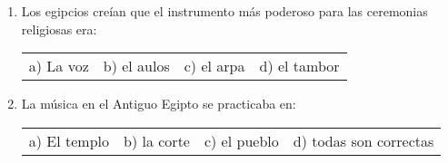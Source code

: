 \documentclass[letterpaper,12pt,notitlepage,spanish]{article}
\begin{document}
%
%
%
\begin{ejercicio}
	\begin{enumerate}
%
%
		\item Los egipcios creían que el instrumento más poderoso para las ceremonias religiosas era: \par
%		
	\begin{tabular}{llll}
		a) La voz & b) el aulos & c) el arpa & d) el tambor\\
	\end{tabular}
%
%
%
%
	\item La música en el Antiguo Egipto se practicaba en: \par
%		
	\begin{tabular}{llll}
		a) El templo & b) la corte & c) el pueblo & d) todas son correctas\\
	\end{tabular}
%
%
\end{enumerate}
\end{ejercicio}
%
\end{document}
